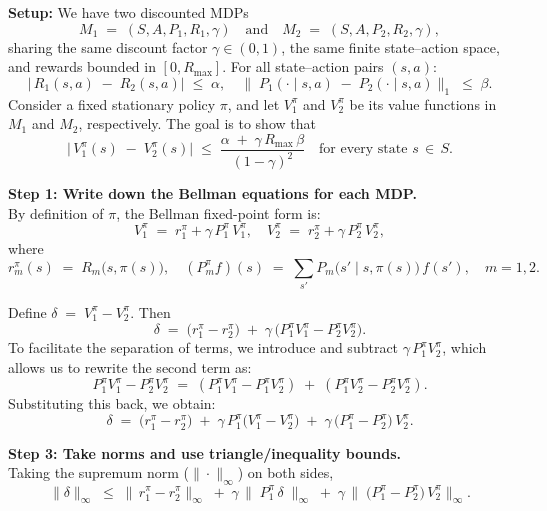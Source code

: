 \textbf{Setup:} We have two discounted MDPs 
\[
  M_1 \;=\; (S, A, P_1, R_1, \gamma)
  \quad\text{and}\quad
  M_2 \;=\; (S, A, P_2, R_2, \gamma),
\]
sharing the same discount factor $\gamma \in (0,1)$, the same finite state--action space, and rewards bounded in $[0,R_{\max}]$.  
For all state--action pairs $(s,a)$:
\[
  \bigl|\,R_1(s,a) \;-\; R_2(s,a)\bigr|\;\le\;\alpha,
  \quad
  \bigl\|\;P_1(\cdot \mid s,a)\;-\;P_2(\cdot \mid s,a)\bigr\|_{1}\;\le\;\beta.
\]
Consider a fixed stationary policy $\pi$, and let $V_{1}^{\pi}$ and $V_{2}^{\pi}$ be its value functions in $M_1$ and $M_2$, respectively. The goal is to show that
\[
  \bigl|\,V_{1}^{\pi}(s)\;-\;V_{2}^{\pi}(s)\bigr|
  \;\le\;
  \frac{\alpha \;+\;\gamma\,R_{\max}\,\beta}{(1-\gamma)^{2}}
  \quad
  \text{for every state }s\,\in\,S.
\]

\bigskip
\noindent
\textbf{Step 1: Write down the Bellman equations for each MDP.}\\
By definition of $\pi$, the Bellman fixed-point form is:
\[
  V_{1}^{\pi} \;=\; r_{1}^{\pi} + \gamma\,P_{1}^{\pi}\,V_{1}^{\pi},
  \quad
  V_{2}^{\pi} \;=\; r_{2}^{\pi} + \gamma\,P_{2}^{\pi}\,V_{2}^{\pi},
\]
where
\[
  r_{m}^{\pi}(s) \;=\; R_{m}\bigl(s,\pi(s)\bigr), 
  \quad
  (P_{m}^{\pi} f)(s) \;=\;
   \sum_{s'}P_{m}\bigl(s'\mid s,\pi(s)\bigr)\,f(s'),
  \quad
  m = 1,2.
\]

Define $\delta \;=\; V_{1}^{\pi}-V_{2}^{\pi}$. Then
\[
  \delta
  \;=\;
  \bigl(r_{1}^{\pi} - r_{2}^{\pi}\bigr)
  \;+\;
  \gamma\,\bigl(P_{1}^{\pi}V_{1}^{\pi} - P_{2}^{\pi}V_{2}^{\pi}\bigr).
\]
To facilitate the separation of terms, we introduce and subtract $\gamma\,P_{1}^{\pi}V_{2}^{\pi}$, which allows us to rewrite the second term as:
\[
  P_{1}^{\pi}V_{1}^{\pi} - P_{2}^{\pi}V_{2}^{\pi}
  \;=\;
  (P_{1}^{\pi}V_{1}^{\pi} - P_{1}^{\pi}V_{2}^{\pi})
  \;+\;
  (P_{1}^{\pi}V_{2}^{\pi} - P_{2}^{\pi}V_{2}^{\pi}).
\]
Substituting this back, we obtain:
\[
  \delta
  \;=\;
  \bigl(r_{1}^{\pi} - r_{2}^{\pi}\bigr)
  \;+\;
  \gamma\,P_{1}^{\pi}\bigl(V_{1}^{\pi}-V_{2}^{\pi}\bigr)
  \;+\;
  \gamma\,\bigl(P_{1}^{\pi}-P_{2}^{\pi}\bigr)\,V_{2}^{\pi}.
\]


\bigskip
\noindent
\textbf{Step 3: Take norms and use triangle/inequality bounds.}\\
Taking the supremum norm ($\|\cdot\|_\infty$) on both sides,
\[
  \|\delta\|_{\infty}
  \;\le\;
  \|\,r_{1}^{\pi}-r_{2}^{\pi}\|_{\infty}
  \;+\;
  \gamma\,\|\;P_{1}^{\pi}\,\delta\;\|_{\infty}
  \;+\;
  \gamma\,\|\;\bigl(P_{1}^{\pi}-P_{2}^{\pi}\bigr)\,V_{2}^{\pi}\|_{\infty}.
\]

